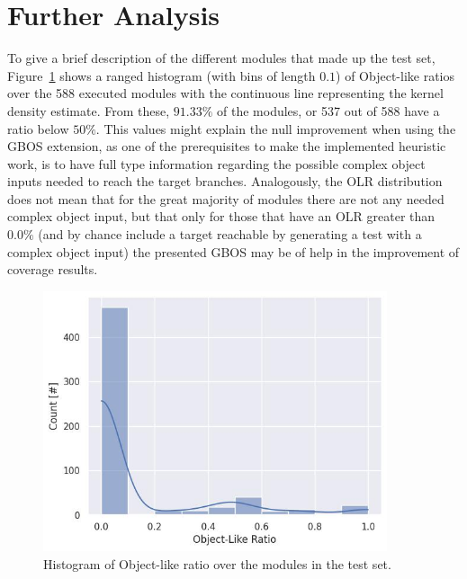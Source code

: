 \documentclass[%
  chapterprefix=false,%
  open=right,%
  twoside=true,%
  paper=a4,%
  logofile={Figures/logo.png},%
  thesistype=master,%
  UKenglish,%
]{se2thesis}
\begin{document}
\newpage

\section{Further Analysis}\label{sec:further}

To give a brief description of the different modules that made up the test set, Figure~\ref{fig:olr-hist} shows a ranged histogram (with bins of length \(0.1\)) of Object-like ratios over the 588 executed modules with the continuous line representing the kernel density estimate.
From these, \(91.33\%\) of the modules, or 537 out of 588 have a ratio below \(50\%\).
This values might explain the null improvement when using the GBOS extension, as one of the prerequisites to make the implemented heuristic work, is to have full type information regarding the possible complex object inputs needed to reach the target branches.
Analogously, the OLR distribution does not mean that for the great majority of modules there are not any needed complex object input, but that only for those that have an OLR greater than \(0.0\%\) (and by chance include a target reachable by generating a test with a complex object input) the presented GBOS may be of help in the improvement of coverage results.

\begin{figure}[bth]
  \centering
  \includegraphics[width=0.9\textwidth]{Figures/Results/olr-hist.jpg}
  \caption{Histogram of Object-like ratio over the modules in the test set.}\label{fig:olr-hist}
\end{figure}
\end{document}
